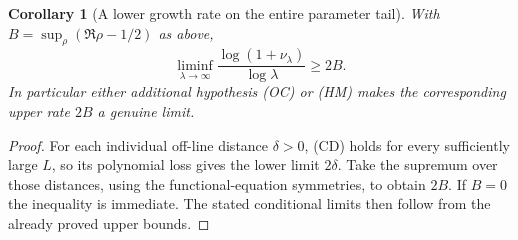 \documentclass[11pt]{article}
\newtheorem{corollary}[theorem]{Corollary}
\theoremstyle{remark}\newtheorem{remark}[theorem]{Remark}
\begin{document}
\begin{corollary}[A lower growth rate on the entire parameter tail]
\label{cor:cofinal-ground-rate}
With $B=\sup_\rho(\Re\rho-1/2)$ as above,
\[
 \liminf_{\lambda\to\infty}
       \frac{\log(1+\nu_\lambda)}{\log\lambda}\ge2B.       \tag{CL}
\]
In particular either additional hypothesis (OC) or (HM) makes
the corresponding upper rate $2B$ a genuine limit.
\end{corollary}
\begin{proof}
For each individual off-line distance $\delta>0$, (CD) holds
for every sufficiently large $L$, so its polynomial loss gives
the lower limit $2\delta$. Take the supremum over those distances,
using the functional-equation symmetries, to obtain $2B$.
If $B=0$ the inequality is immediate. The stated conditional
limits then follow from the already proved upper bounds.
\end{proof}
\end{document}
